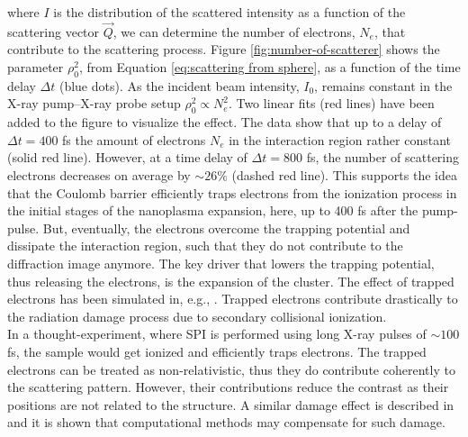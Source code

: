 where $I$ is the distribution of the scattered intensity as a function of the scattering vector $\vec{Q}$, we can determine the number of electrons, $N_{e}$, that contribute to the scattering process. Figure \ref{fig:number-of-scatterer} shows the parameter $\rho_{0}^{2}$, from Equation \eqref{eq:scattering from sphere}, as a function of the time delay $\Delta t$ (blue dots). As the incident beam intensity, $I_{0}$, remains constant in the X-ray pump--X-ray probe setup $\rho_{0}^{2} \propto N_{e}^{2}$. Two linear fits (red lines) have been added to the figure to visualize the effect. The data show that up to a delay of $\Delta t=400$ fs the amount of electrons $N_{e}$ in the interaction region rather constant (solid red line). However, at a time delay of $\Delta t=800$ fs, the number of scattering electrons decreases on average by $\sim 26 \%$ (dashed red line). This supports the idea that the Coulomb barrier efficiently traps electrons from the ionization process in the initial stages of the nanoplasma expansion, here, up to 400 fs after the pump-pulse. But, eventually, the electrons overcome the trapping potential and dissipate the interaction region, such that they do not contribute to the diffraction image anymore. The key driver that lowers the trapping potential, thus releasing the electrons, is the expansion of the cluster. The effect of trapped electrons has been simulated in, e.g., \citep{Hau-Riege-2004-PRE}. Trapped electrons contribute drastically to the radiation damage process due to secondary collisional ionization.\\[1\baselineskip]
%
In a thought-experiment, where SPI is performed using long X-ray pulses of $\sim 100$ fs, the sample would get ionized and efficiently traps electrons. The trapped electrons can be treated as non-relativistic, thus they do contribute coherently to the scattering pattern. However, their contributions reduce the contrast as their positions are not related to the structure. A similar damage effect is described in \citep{Quiney-2010-NatPhys} and it is shown that computational methods may compensate for such damage.\\[1\baselineskip]
